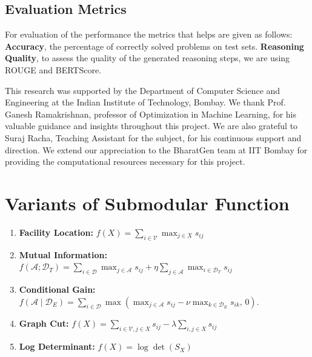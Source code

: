 \documentclass{article}
\begin{document}
\subsection{Evaluation Metrics}

For evaluation of the performance the metrics that helps are given as follows:
\textbf{Accuracy}, the percentage of correctly solved problems on test sets. \textbf{Reasoning Quality}, to assess the quality of the generated reasoning steps, we are using ROUGE and BERTScore.


\begin{ack}
    This research was supported by the Department of Computer Science and Engineering at the Indian Institute of Technology, Bombay. We thank Prof. Ganesh Ramakrishnan, professor of Optimization in Machine Learning, for his valuable guidance and insights throughout this project. We are also grateful to Suraj Racha, Teaching Assistant for the subject, for his continuous support and direction. We extend our appreciation to the BharatGen team at IIT Bombay for providing the computational resources necessary for this project.
\end{ack}




\nocite{*}

\appendix

\section{Variants of Submodular Function}
\label{appendix:submodfunctions}
\begin{enumerate}
    \item \textbf{Facility Location:} \quad $f(X) = \sum_{i \in \mathcal{V}} \max_{j \in X} s_{ij}$
    \item \textbf{Mutual Information:} \quad $f(\mathcal{A}; \mathcal{D}_T) = \sum_{i \in \mathcal{D}} \max_{j \in \mathcal{A}} s_{ij} 
+ \eta \sum_{j \in \mathcal{A}} \max_{i \in \mathcal{D}_T} s_{ij}$
    \item \textbf{Conditional Gain:} \quad $f(\mathcal{A} \mid \mathcal{D}_E) =
\sum_{i \in \mathcal{D}} \max \left( \max_{j \in \mathcal{A}} s_{ij}
- \nu \max_{k \in \mathcal{D}_E} s_{ik},\, 0 \right)$.
    \item \textbf{Graph Cut:} \quad $f(X) = \sum_{i \in \mathcal{V}, j \in X} s_{ij} - \lambda \sum_{i, j \in X} s_{ij}$
    \item \textbf{Log Determinant:} \quad $f(X) = \log \det(S_X)$
\end{enumerate}
\end{document}
